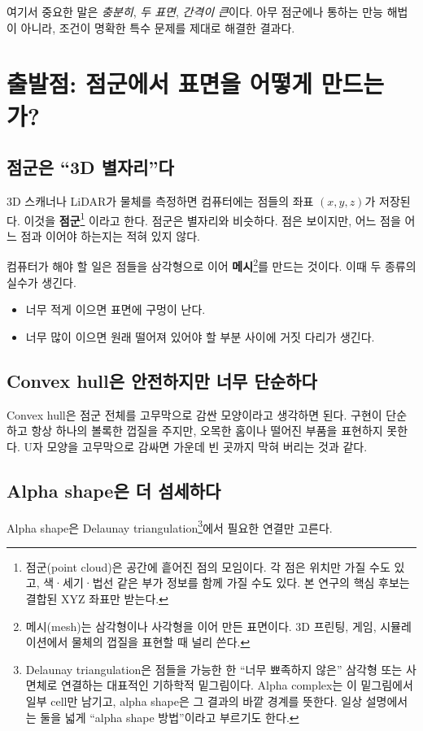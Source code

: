 \documentclass[11pt,a4paper]{article}
\begin{document}
여기서 중요한 말은 \emph{충분히}, \emph{두 표면}, \emph{간격이 큰}이다.
아무 점군에나 통하는 만능 해법이 아니라, 조건이 명확한 특수 문제를 제대로
해결한 결과다.

\section{출발점: 점군에서 표면을 어떻게 만드는가?}

\subsection{점군은 ``3D 별자리''다}

3D 스캐너나 LiDAR가 물체를 측정하면 컴퓨터에는 점들의 좌표
$(x,y,z)$가 저장된다. 이것을 \textbf{점군}\footnote{점군(point cloud)은
공간에 흩어진 점의 모임이다. 각 점은 위치만 가질 수도 있고, 색·세기·법선 같은
부가 정보를 함께 가질 수도 있다. 본 연구의 핵심 후보는 결합된 XYZ 좌표만 받는다.}
이라고 한다. 점군은 별자리와 비슷하다. 점은 보이지만, 어느 점을 어느 점과
이어야 하는지는 적혀 있지 않다.

컴퓨터가 해야 할 일은 점들을 삼각형으로 이어 \textbf{메시}\footnote{메시(mesh)는
삼각형이나 사각형을 이어 만든 표면이다. 3D 프린팅, 게임, 시뮬레이션에서 물체의
껍질을 표현할 때 널리 쓴다.}를 만드는 것이다. 이때 두 종류의 실수가 생긴다.

\begin{itemize}
  \item 너무 적게 이으면 표면에 구멍이 난다.
  \item 너무 많이 이으면 원래 떨어져 있어야 할 부분 사이에 거짓 다리가 생긴다.
\end{itemize}

\subsection{Convex hull은 안전하지만 너무 단순하다}

Convex hull은 점군 전체를 고무막으로 감싼 모양이라고 생각하면 된다.
구현이 단순하고 항상 하나의 볼록한 껍질을 주지만, 오목한 홈이나 떨어진 부품을
표현하지 못한다. U자 모양을 고무막으로 감싸면 가운데 빈 곳까지 막혀 버리는 것과
같다.

\subsection{Alpha shape은 더 섬세하다}

Alpha shape은 Delaunay triangulation\footnote{Delaunay triangulation은
점들을 가능한 한 ``너무 뾰족하지 않은'' 삼각형 또는 사면체로 연결하는 대표적인
기하학적 밑그림이다. Alpha complex는 이 밑그림에서 일부 cell만 남기고,
alpha shape은 그 결과의 바깥 경계를 뜻한다. 일상 설명에서는 둘을 넓게
``alpha shape 방법''이라고 부르기도 한다.}에서 필요한 연결만 고른다.
\end{document}
